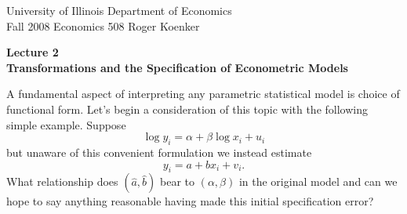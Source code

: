 \documentclass[11pt]{amsbook}
\begin{document}
\noindent
University of Illinois \hfill Department of Economics \\
Fall 2008 \hfill {\large  Economics 508} \hfill Roger Koenker

\vspace{4mm}
\begin{center}

\large{
{\bf Lecture 2\\
Transformations and the Specification of Econometric Models
}}
\end{center}

\vspace{10mm}
A fundamental aspect of interpreting any parametric statistical model is
choice of functional form.  Let's begin a consideration of this topic with 
the following simple example.  Suppose
$$
\log y_i = \alpha + \beta \log x_i + u_i
$$
but unaware of this convenient formulation we instead estimate
$$
y_i = a + bx_i + v_i.
$$
What relationship does $(\hat a , \hat b)$ bear to $(\alpha, \beta)$ in the 
original model and can we hope to say anything reasonable having made this 
initial specification error?
\end{document}
